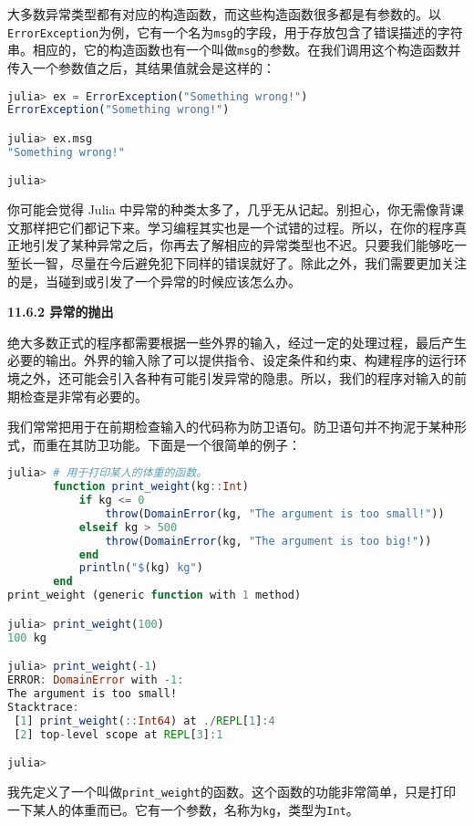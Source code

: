 大多数异常类型都有对应的构造函数，而这些构造函数很多都是有参数的。以\verb|ErrorException|为例，它有一个名为\verb|msg|的字段，用于存放包含了错误描述的字符串。相应的，它的构造函数也有一个叫做\verb|msg|的参数。在我们调用这个构造函数并传入一个参数值之后，其结果值就会是这样的：

\begin{lstlisting}[language=julia]
julia> ex = ErrorException("Something wrong!")
ErrorException("Something wrong!")

julia> ex.msg
"Something wrong!"

julia> 
\end{lstlisting}

你可能会觉得 Julia 中异常的种类太多了，几乎无从记起。别担心，你无需像背课文那样把它们都记下来。学习编程其实也是一个试错的过程。所以，在你的程序真正地引发了某种异常之后，你再去了解相应的异常类型也不迟。只要我们能够吃一堑长一智，尽量在今后避免犯下同样的错误就好了。除此之外，我们需要更加关注的是，当碰到或引发了一个异常的时候应该怎么办。

\textbf{11.6.2 异常的抛出}

绝大多数正式的程序都需要根据一些外界的输入，经过一定的处理过程，最后产生必要的输出。外界的输入除了可以提供指令、设定条件和约束、构建程序的运行环境之外，还可能会引入各种有可能引发异常的隐患。所以，我们的程序对输入的前期检查是非常有必要的。

我们常常把用于在前期检查输入的代码称为防卫语句。防卫语句并不拘泥于某种形式，而重在其防卫功能。下面是一个很简单的例子：

\begin{lstlisting}[language=julia]
julia> # 用于打印某人的体重的函数。
       function print_weight(kg::Int)
           if kg <= 0
               throw(DomainError(kg, "The argument is too small!"))
           elseif kg > 500 
               throw(DomainError(kg, "The argument is too big!"))
           end
           println("$(kg) kg")
       end
print_weight (generic function with 1 method)

julia> print_weight(100)
100 kg

julia> print_weight(-1)
ERROR: DomainError with -1:
The argument is too small!
Stacktrace:
 [1] print_weight(::Int64) at ./REPL[1]:4
 [2] top-level scope at REPL[3]:1

julia> 
\end{lstlisting}

我先定义了一个叫做\verb|print_weight|的函数。这个函数的功能非常简单，只是打印一下某人的体重而已。它有一个参数，名称为\verb|kg|，类型为\verb|Int|。

